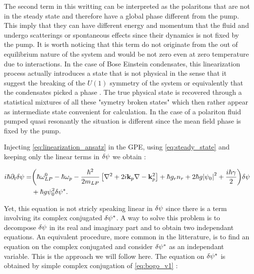 The second term in this writting can be interpreted as the polaritons that are not in the steady state and therefore have a global phase different from the pump. 
This imply that they can have different energy and momentum that the fluid and undergo scatterings or spontaneous effects since their dynamics is not fixed by the pump. It is 
worth noticing that this term do not originate from the out of equilibrium nature of the system and would be not zero even at zero temperature due to interactions.
In the case of Bose Einstein condensates, this linearization process actually introduces a state that is not physical in the sense that it suggest the breaking of the $U(1)$ symmetry of the system or equivalently 
 that the condensates picked a phase \cite{castin_bose-einstein_2001}. The true physical state is recovered through a statistical mixtures of all these "symetry broken states" which then rather appear 
as intermediate state convenient for calculation. In the case of a polariton fluid pumped quasi resonantly the situation is different since the mean field phase 
is fixed by the pump. 

\bigskip

Injecting \autoref{eq:linearization_ansatz} in the GPE, using \autoref{eq:steady_state} and keeping only the linear terms in $\delta\psi$ we obtain :

\begin{equation}
    \begin{split}
        i  \hbar \partial_t \delta\psi =& \biggl(\hbar\omega_{LP}^0 - \hbar \omega_p-\dfrac{\hbar^2}{2m_{LP}}\left[\nabla^2 +2i\mathbf{k}_p\nabla-\mathbf{k}_p^2\right]+\hbar g_rn_r + 2\hbar g \abs{\psi_0}^2+ \dfrac{i\hbar\gamma}{2} \biggr) \delta\psi \\
                                    &+ \hbar g \psi_0^2 \delta\psi^*. 
    \end{split}
    \label{eq:bogo_v1}
\end{equation}

Yet, this equation is not stricly speaking linear in $\delta\psi$ since there is a term involving its complex conjugated $\delta\psi^*$. A way to solve this problem
is to decompose $\delta\psi$ in its real and imaginary part and to obtain two independant equations. An equivalent procedure, more common in the litterature, is to find an equation on 
the complex conjugated and consider $\delta\psi^*$ as an independant variable. This is the approach we will follow here. The equation on $\delta\psi^*$ is obtained by simple complex conjugation of \autoref{eq:bogo_v1} :

